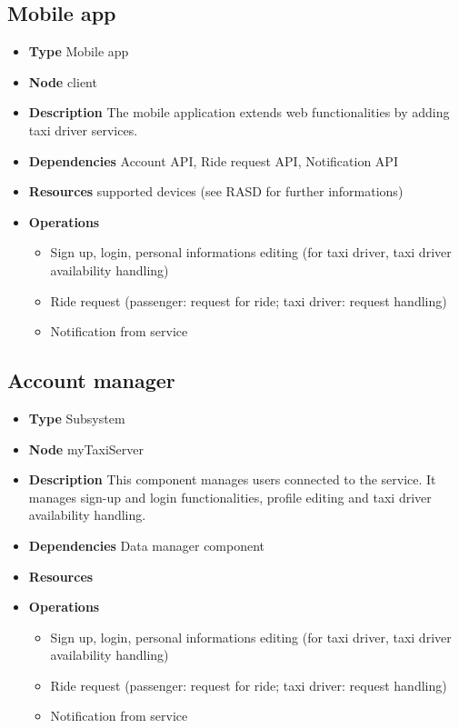 \subsection{Mobile app}
\begin{itemize}
	\item[]\textbf{Type} Mobile app
	\item[]\textbf{Node} client
	\item[]\textbf{Description} The mobile application extends web functionalities by adding taxi driver services. 
	\item[]\textbf{Dependencies} Account API, Ride request API, Notification API
	\item[]\textbf{Resources} supported devices (see RASD for further informations)
	\item[]\textbf{Operations} \begin{itemize}
		\item Sign up, login, personal informations editing (for taxi driver, taxi driver availability handling)
		\item Ride request (passenger: request for ride; taxi driver: request handling)
		\item Notification from service
	\end{itemize}
\end{itemize}

\subsection{Account manager}
\begin{itemize}
	\item[]\textbf{Type} Subsystem
	\item[]\textbf{Node} myTaxiServer
	\item[]\textbf{Description} This component manages users connected to the service. It manages sign-up and login functionalities, profile editing and taxi driver availability handling.
	\item[]\textbf{Dependencies} Data manager component
	\item[]\textbf{Resources} 
	\item[]\textbf{Operations} \begin{itemize}
		\item Sign up, login, personal informations editing (for taxi driver, taxi driver availability handling)
		\item Ride request (passenger: request for ride; taxi driver: request handling)
		\item Notification from service
	\end{itemize}
\end{itemize}

